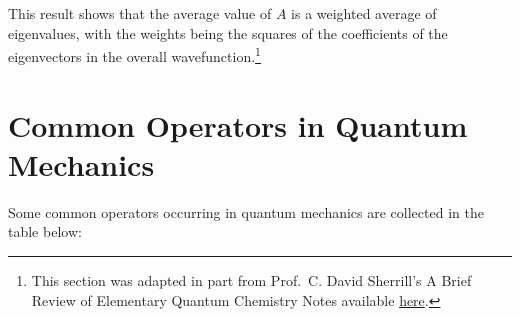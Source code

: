 \documentclass[
  9pt,
]{extbook}
\theoremstyle{definition}
\theoremstyle{definition}
\theoremstyle{definition}
\theoremstyle{remark}
\begin{document}
This result shows that the average value of \(A\) is a weighted average of eigenvalues, with the weights being the squares of the coefficients of the eigenvectors in the overall wavefunction.\footnote{This section was adapted in part from Prof.~C. David Sherrill's A Brief Review of Elementary Quantum Chemistry Notes available \href{http://vergil.chemistry.gatech.edu/notes/quantrev/node1.html}{here}.}

\hypertarget{common-operators-in-quantum-mechanics}{%
\section{Common Operators in Quantum Mechanics}\label{common-operators-in-quantum-mechanics}}

Some common operators occurring in quantum mechanics are collected in the table below:

\tiny
\end{document}

